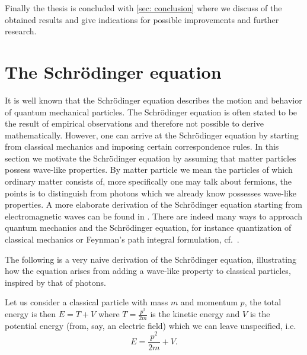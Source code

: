 Finally the thesis is concluded with \cref{sec: conclusion} where we discuss of the obtained results and give indications for possible improvements and further research.








\section{The Schrödinger equation}

It is well known that the Schrödinger equation describes the motion and behavior of quantum mechanical particles. The Schrödinger equation is often stated to be the result of empirical observations and therefore not possible to derive mathematically. However, one can arrive at the Schrödinger equation by starting from classical mechanics and imposing certain correspondence rules. In this section we motivate the Schrödinger equation by assuming that matter particles possess wave-like properties. By matter particle we mean the particles of which ordinary matter consists of, more specifically one may talk about fermions, the points is to distinguish from photons which we already know possesses wave-like properties. A more elaborate derivation of the Schrödinger equation starting from electromagnetic waves can be found in \cite{SE derivaiton}. There are indeed many ways to approach quantum mechanics and the Schrödinger equation, for instance quantization of classical mechanics or Feynman's path integral formulation, cf.\ \cite{feynman quantum mechanics}.

The following is a very naive derivation of the Schrödinger equation, illustrating how the equation arises from adding a wave-like property to classical particles, inspired by that of photons.

Let us consider a classical particle with mass $m$ and momentum $p$, the total energy is then $E = T + V$ where $T = \frac{p^2}{2m}$ is the kinetic energy and $V$ is the potential energy (from, say, an electric field) which we can leave unspecified, i.e.
\begin{equation}\label{eq: total energy}
  E = \frac{p^2}{2m} + V.
\end{equation}

